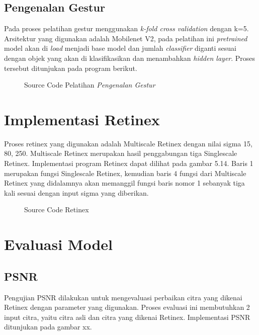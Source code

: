 \subsection{Pengenalan Gestur}
Pada proses pelatihan gestur menggunakan \textit{k-fold cross validation} dengan k=5. Arsitektur yang digunakan adalah Mobilenet V2, pada pelatihan ini \textit{pretrained} model akan di \textit{load} menjadi base model dan jumlah \textit{classifier} diganti sesuai dengan objek yang akan di klasifikasikan dan menambahkan \textit{hidden layer}. Proses tersebut ditunjukan pada program berikut.
\begin{figure}[H]
	\centering
	
	\caption{Source Code Pelatihan \textit{Pengenalan Gestur}}
\end{figure}

\section{Implementasi Retinex}
Proses retinex yang digunakan adalah Multiscale Retinex dengan nilai sigma 15, 80, 250. Multiscale Retinex merupakan hasil penggabungan tiga Singlescale Retinex. Implementasi program Retinex dapat dilihat pada gambar  5.14. Baris 1 merupakan fungsi Singlescale Retinex, kemudian baris 4 fungsi dari Multiscale Retinex yang didalamnya akan memanggil fungsi baris nomor 1 sebanyak tiga kali sesuai dengan input sigma yang diberikan.
\begin{figure}[H]
	\centering
	
	\caption{Source Code Retinex}
\end{figure}
\section{Evaluasi Model}
\subsection{PSNR}
Pengujian PSNR dilakukan untuk mengevaluasi perbaikan citra yang dikenai Retinex dengan parameter yang digunakan. Proses evaluasi ini membutuhkan 2 input citra, yaitu citra asli dan citra yang dikenai Retinex. Implementasi PSNR ditunjukan pada gambar xx.

